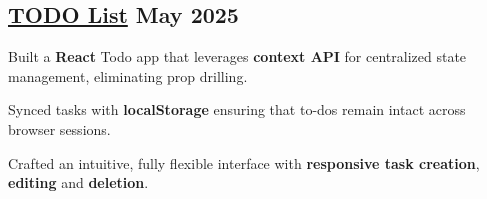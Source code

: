 \subsection{{\href{https://todos-thepratikguptaas-projects.vercel.app/}{TODO List} \hfill May 2025}}
\begin{zitemize}
\item Built a \textbf{React} Todo app that leverages \textbf{context API} for centralized state management, eliminating prop drilling.
\item Synced tasks with \textbf{localStorage} ensuring that to-dos remain intact across browser sessions.
\item Crafted an intuitive, fully flexible interface with  \textbf{responsive task creation}, \textbf{editing} and \textbf{deletion}.
\end{zitemize}
